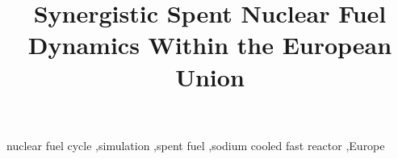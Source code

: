 \documentclass[preprint,review]{elsarticle}
\begin{document}
\begin{frontmatter}

\title{Synergistic Spent Nuclear Fuel Dynamics Within the European Union}







\begin{keyword}
nuclear fuel cycle \sep simulation \sep spent fuel \sep sodium cooled fast reactor \sep Europe
\end{keyword}

\end{frontmatter}




\FloatBarrier


\FloatBarrier



\pagebreak

\end{document}
